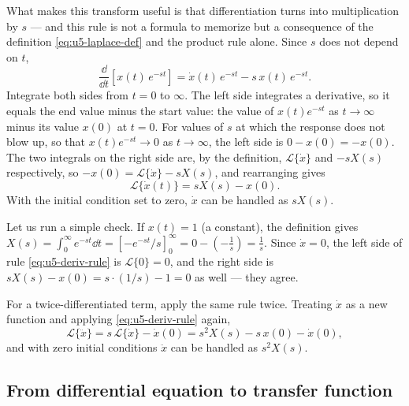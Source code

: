 What makes this transform useful is that differentiation turns into
multiplication by $s$ --- and this rule is not a formula to memorize but a
consequence of the definition \eqref{eq:u5-laplace-def} and the product rule
alone.
Since $s$ does not depend on $t$,
\begin{equation}
  \frac{\dd}{\dd t}\left[x(t)\,e^{-st}\right]
  = \dot{x}(t)\,e^{-st} - s\,x(t)\,e^{-st}.
\end{equation}
Integrate both sides from $t=0$ to $\infty$.
The left side integrates a derivative, so it equals the end value minus the
start value: the value of $x(t)e^{-st}$ as $t\to\infty$ minus its value
$x(0)$ at $t=0$.
For values of $s$ at which the response does not blow up, so that
$x(t)e^{-st}\to 0$ as $t\to\infty$, the left side is $0 - x(0) = -x(0)$.
The two integrals on the right side are, by the definition,
$\mathcal{L}\{\dot{x}\}$ and $-sX(s)$ respectively, so
$-x(0) = \mathcal{L}\{\dot{x}\} - sX(s)$, and rearranging gives
\begin{equation}
  \mathcal{L}\{\dot{x}(t)\} = sX(s) - x(0).
  \label{eq:u5-deriv-rule}
\end{equation}
With the initial condition set to zero, $\dot{x}$ can be handled as
$sX(s)$.

Let us run a simple check.
If $x(t)=1$ (a constant), the definition gives
$X(s)=\int_0^\infty e^{-st}\dd t
=\left[-e^{-st}/s\right]_0^\infty
=0-\left(-\tfrac{1}{s}\right)=\tfrac{1}{s}$.
Since $\dot{x}=0$, the left side of rule \eqref{eq:u5-deriv-rule} is
$\mathcal{L}\{0\}=0$, and the right side is
$sX(s)-x(0)=s\cdot(1/s)-1=0$ as well --- they agree.

For a twice-differentiated term, apply the same rule twice.
Treating $\dot{x}$ as a new function and applying
\eqref{eq:u5-deriv-rule} again,
\begin{equation}
  \mathcal{L}\{\ddot{x}\}
  = s\,\mathcal{L}\{\dot{x}\} - \dot{x}(0)
  = s^2 X(s) - s\,x(0) - \dot{x}(0),
\end{equation}
and with zero initial conditions $\ddot{x}$ can be handled as $s^2 X(s)$.

\subsection{From differential equation to transfer function}

